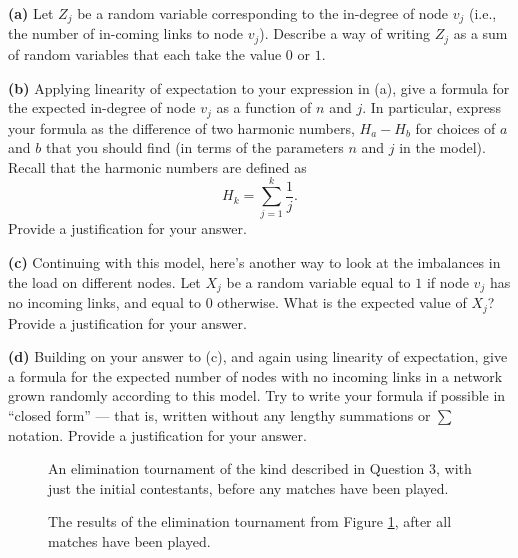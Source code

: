 \documentclass[12pt]{article}
\begin{document}
\gap
{\bf (a)} 
Let $Z_j$ be a random variable corresponding to the in-degree of node $v_j$
(i.e., the number of in-coming links to node $v_j$).
Describe a way of writing $Z_j$ as a sum of random variables 
that each take the value $0$ or $1$.

\gap

{\bf (b)}
Applying linearity of expectation to your expression in (a), 
give a formula for the expected in-degree of node $v_j$
as a function of $n$ and $j$.
In particular, express your formula as the difference of
two harmonic numbers, $H_a - H_b$ for choices of $a$ and $b$
that you should find
(in terms of the parameters $n$ and $j$ in the model).
Recall that the harmonic numbers are defined as 
$$H_k = \sum_{j=1}^k \frac{1}{j}.$$
Provide a justification for your answer.

\gap

{\bf (c)}
Continuing with this model,
here's another way to look at the imbalances in the load on different nodes.
Let $X_j$ be a random variable equal to $1$ if node $v_j$ has
no incoming links, and equal to $0$ otherwise.
What is the expected value of $X_j$?
Provide a justification for your answer.

\gap

{\bf (d)}
Building on your answer to (c), and again using 
linearity of expectation, 
give a formula for the expected number of nodes
with no incoming links
in a network grown randomly according to this model.
Try to write your formula if possible in ``closed form'' --- that is, written
without any lengthy summations or $\sum$ notation.
Provide a justification for your answer.

\begin{figure}[t]
\begin{center}
\hspace*{0.1in} \caption{An 
elimination tournament of the kind described in Question 3,
with just the initial contestants, before any matches have been played.
\rs
\label{fig:elim-blank}
}
\end{center}
\end{figure}

\begin{figure}[t]
\begin{center}
\hspace*{0.1in} \caption{The 
results of the elimination tournament from Figure \ref{fig:elim-blank}, after all matches have been played.
\rs
\label{fig:elim}
}
\end{center}
\end{figure}
\end{document}
